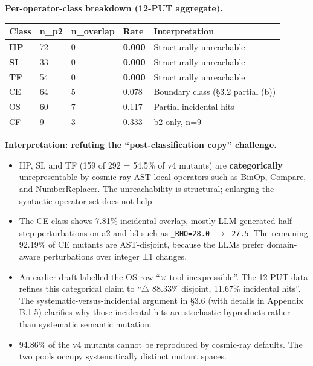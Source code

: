 \documentclass[review,12pt,authoryear]{elsarticle}
\providecommand{\tightlist}{\setlength{\itemsep}{0pt}\setlength{\parskip}{0pt}}
\newcounter{none}                   %
\begin{document}
\textbf{Per-operator-class breakdown (12-PUT aggregate).}

{\def\LTcaptype{none} %
\begin{longtable}[]{@{}lllll@{}}
\toprule\noalign{}
Class & n\_p2 & n\_overlap & Rate & Interpretation \\
\midrule\noalign{}
\endhead
\bottomrule\noalign{}
\endlastfoot
\textbf{HP} & 72 & 0 & \textbf{0.000} & Structurally unreachable \\
\textbf{SI} & 33 & 0 & \textbf{0.000} & Structurally unreachable \\
\textbf{TF} & 54 & 0 & \textbf{0.000} & Structurally unreachable \\
CE & 64 & 5 & 0.078 & Boundary class (§3.2 partial (b)) \\
OS & 60 & 7 & 0.117 & Partial incidental hits \\
CF & 9 & 3 & 0.333 & b2 only, n=9 \\
\end{longtable}
}

\textbf{Interpretation: refuting the ``post-classification copy''
challenge.}

\begin{itemize}
\tightlist
\item
  HP, SI, and TF (159 of 292 = 54.5\% of v4 mutants) are
  \textbf{categorically} unrepresentable by cosmic-ray AST-local
  operators such as BinOp, Compare, and NumberReplacer. The
  unreachability is structural; enlarging the syntactic operator set
  does not help.
\item
  The CE class shows 7.81\% incidental overlap, mostly LLM-generated
  half-step perturbations on a2 and b3 such as
  \texttt{\_RHO=28.0\ $\to$\ 27.5}. The remaining 92.19\% of CE mutants are
  AST-disjoint, because the LLMs prefer domain-aware perturbations over
  integer ±1 changes.
\item
  An earlier draft labelled the OS row ``$\times$ tool-inexpressible''. The
  12-PUT data refines this categorical claim to ``$\bigtriangleup$ 88.33\% disjoint,
  11.67\% incidental hits''. The systematic-versus-incidental argument
  in §3.6 (with details in Appendix B.1.5) clarifies why those
  incidental hits are stochastic byproducts rather than systematic
  semantic mutation.
\item
  94.86\% of the v4 mutants cannot be reproduced by cosmic-ray defaults.
  The two pools occupy systematically distinct mutant spaces.
\end{itemize}
\end{document}
